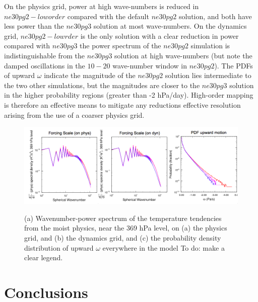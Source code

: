 \documentclass{agujournal}
\begin{document}
On the physics grid, power at high wave-numbers is reduced in $ne30pg2-loworder$ compared with the default $ne30pg2$ solution, and both have less power than the $ne30pg3$ solution at most wave-numbers. On the dynamics grid, $ne30pg2-lowrder$ is the only solution with a clear reduction in power compared with $ne30pg3$ \textemdash the power spectrum of the $ne30pg2$ simulation is indistinguishable from the $ne30pg3$ solution at high wave-numbers (but note the damped oscillations in the $10-20$ wave-number window in $ne30pg2$). The PDFs of upward $\omega$ indicate the magnitude of the $ne30pg2$ solution lies intermediate to the two other simulations, but the magnitudes are closer to the $ne30pg3$ solution in the higher probability regions (greater than -2 hPa/day). High-order mapping is therefore an effective means to mitigate any reductions effective resolution arising from the use of a coarser physics grid.

\begin{figure}[t]
\begin{center}
\noindent\includegraphics[width=30pc,angle=0]{figs/loworder-panel.png}\\
\end{center}
\caption{(a) Wavenumber-power spectrum of the temperature tendencies from the moist physics, near the 369 hPa level, on (a) the physics grid, and (b) the dynamics grid, and (c) the probability density distribution of upward $\omega$ everywhere in the model {\color{red}To do: make a clear legend.}}
\label{fig:loworder}
\end{figure}


\section{Conclusions}




\end{document}
